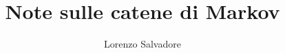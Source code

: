 \documentclass{article}
\title{Note sulle catene di Markov}
\author{Lorenzo Salvadore}
\date{}
\begin{document}
	\maketitle
	\tableofcontents
	
	
	
	
	\pagebreak
	\printindex
\end{document}
